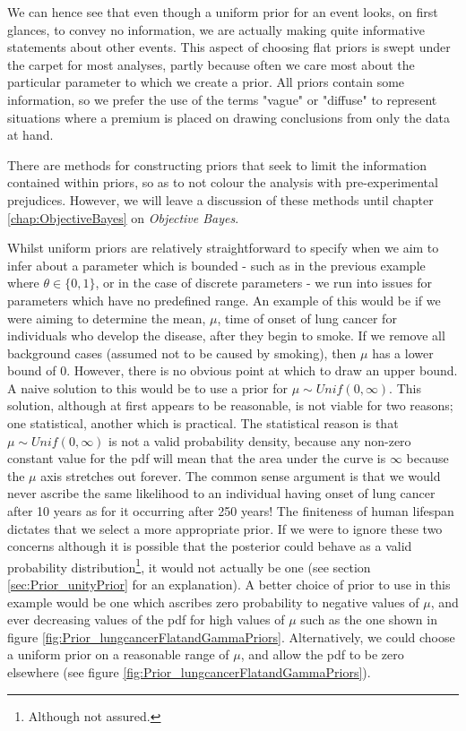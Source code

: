 \documentclass[11pt,fullpage]{book}
\begin{document}
We can hence see that even though a uniform prior for an event looks, on first glances, to convey no information, we are actually making quite informative statements about other events. This aspect of choosing flat priors is swept under the carpet for most analyses, partly because often we care most about the particular parameter to which we create a prior. All priors contain some information, so we prefer the use of the terms "vague" or "diffuse" to represent situations where a premium is placed on drawing conclusions from only the data at hand.

There are methods for constructing priors that seek to limit the information contained within priors, so as to not colour the analysis with pre-experimental prejudices. However, we will leave a discussion of these methods until chapter \ref{chap:ObjectiveBayes} on \textit{Objective Bayes}.

Whilst uniform priors are relatively straightforward to specify when we aim to infer about a parameter which is bounded - such as in the previous example where $\theta\in\{0,1\}$, or in the case of discrete parameters - we run into issues for parameters which have no predefined range. An example of this would be if we were aiming to determine the mean, $\mu$, time of onset of lung cancer for individuals who develop the disease, after they begin to smoke. If we remove all background cases (assumed not to be caused by smoking), then $\mu$ has a lower bound of 0. However, there is no obvious point at which to draw an upper bound. A naive solution to this would be to use a prior for $\mu\sim Unif(0,\infty)$. This solution, although at first appears to be reasonable, is not viable for two reasons; one statistical, another which is practical. The statistical reason is that $\mu\sim Unif(0,\infty)$ is not a valid probability density, because any non-zero constant value for the pdf will mean that the area under the curve is $\infty$ because the $\mu$ axis stretches out forever. The common sense argument is that we would never ascribe the same likelihood to an individual having onset of lung cancer after 10 years as for it occurring after 250 years! The finiteness of human lifespan dictates that we select a more appropriate prior. If we were to ignore these two concerns although it is possible that the posterior could behave as a valid probability distribution\footnote{Although not assured.}, it would not actually be one (see section \ref{sec:Prior_unityPrior} for an explanation). A better choice of prior to use in this example would be one which ascribes zero probability to negative values of $\mu$, and ever decreasing values of the pdf for high values of $\mu$ such as the one shown in figure \ref{fig:Prior_lungcancerFlatandGammaPriors}. Alternatively, we could choose a uniform prior on a reasonable range of $\mu$, and allow the pdf to be zero elsewhere (see figure \ref{fig:Prior_lungcancerFlatandGammaPriors}).
\end{document}
